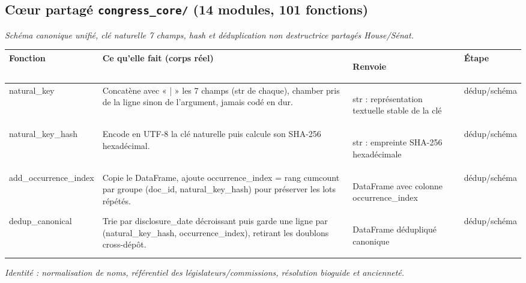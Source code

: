 \documentclass[11pt,a4paper]{article}
\makeatletter
\newenvironment{fnt}{%
  \par\footnotesize
  \setlength{\tabcolsep}{3pt}%
  \begin{longtable}{@{}>{\ttfamily\scriptsize\raggedright\arraybackslash}p{3.0cm} >{\raggedright\arraybackslash}p{7.5cm} >{\itshape\scriptsize\raggedright\arraybackslash}p{2.7cm} >{\scriptsize\raggedright\arraybackslash}p{1.85cm}@{}}
  \toprule
  \normalfont\bfseries\scriptsize Fonction & \bfseries\scriptsize Ce qu'elle fait (corps réel) &
  \normalfont\bfseries\scriptsize Renvoie & \normalfont\bfseries\scriptsize Étape\\
  \midrule\endhead
}{\bottomrule\end{longtable}\par}
\newcommand{\fnmod}[2]{\par\smallskip\noindent{\ttfamily\bfseries #1}\;\textmd{\itshape\small\textemdash{} #2}\par\nobreak\vspace{2pt}}
\makeatother
\begin{document}
\subsection{C\oe{}ur partag\'e \textemdash{} \texttt{congress\_core/} (14 modules, 101 fonctions)}
\fnmod{schema.py}{Schéma canonique unifié, clé naturelle 7 champs, hash et déduplication non destructrice partagés House/Sénat.}
\begin{fnt}
natural_\allowbreak key & Concatène avec « | » les 7 champs (str de chaque)\allowbreak{},\allowbreak{} chamber pris de la ligne sinon de l'argument,\allowbreak{} jamais codé en dur. & str : représentation textuelle stable de la clé & dédup/schéma \\
natural_\allowbreak key_\allowbreak hash & Encode en UTF-8 la clé naturelle puis calcule son SHA-256 hexadécimal. & str : empreinte SHA-256 hexadécimale & dédup/schéma \\
add_\allowbreak occurrence_\allowbreak index & Copie le DataFrame,\allowbreak{} ajoute occurrence_index =\allowbreak{} rang cumcount par groupe (doc_id,\allowbreak{} natural_key_hash)\allowbreak{} pour préserver les lots répétés. & DataFrame avec colonne occurrence_index & dédup/schéma \\
dedup_\allowbreak canonical & Trie par disclosure_date décroissant puis garde une ligne par (natural_key_hash,\allowbreak{} occurrence_index)\allowbreak{},\allowbreak{} retirant les doublons cross-dépôt. & DataFrame dédupliqué canonique & dédup/schéma \\
\end{fnt}
\fnmod{identity.py}{Identité : normalisation de noms, référentiel des législateurs/commissions, résolution bioguide et ancienneté.}
\end{document}
